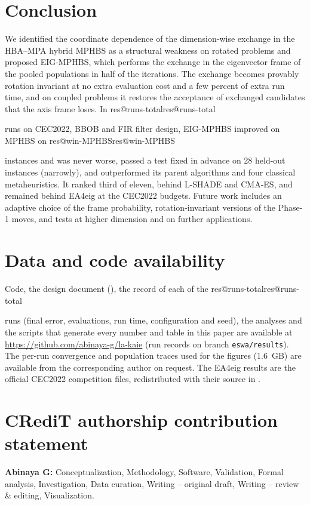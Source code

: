 \documentclass[preprint,12pt,authoryear]{elsarticle}
\makeatletter
\theoremstyle{remark}
\def\res#1{\ifcsname res@#1\endcsname\csname res@#1\endcsname\else\PackageError{res}{Undefined result key #1}{}\fi}
\makeatother
\begin{document}
\section{Conclusion}
\label{sec:conclusion}
We identified the coordinate dependence of the dimension-wise exchange in the HBA--MPA hybrid MPHBS as a structural
weakness on rotated problems and proposed EIG-MPHBS, which performs the exchange in the eigenvector frame of the pooled
populations in half of the iterations. The exchange becomes provably rotation invariant at no extra evaluation cost and
a few percent of extra run time, and on coupled problems it restores the acceptance of exchanged candidates that the
axis frame loses. In \res{runs-total} runs on CEC2022, BBOB and FIR filter design, EIG-MPHBS improved on MPHBS on
\res{win-MPHBS} instances and was never worse, passed a test fixed in advance on 28 held-out instances (narrowly), and
outperformed its parent algorithms and four classical metaheuristics. It ranked third of eleven, behind L-SHADE and
CMA-ES, and remained behind EA4eig at the CEC2022 budgets. Future work includes an adaptive choice of the frame
probability, rotation-invariant versions of the Phase-1 moves, and tests at higher dimension and on further
applications.

\section*{Data and code availability}
Code, the design document (), the record of each of the \res{runs-total}
runs (final error, evaluations, run time, configuration and seed), the analyses and the scripts that generate every
number and table in this paper are available at
\url{https://github.com/abinaya-g/la-kaie} (run records on branch \texttt{eswa/results}).
The per-run convergence and population traces used for the figures (1.6~GB) are available from the corresponding
author on request. The EA4eig results are the official CEC2022 competition files, redistributed with their source in
.

\section*{CRediT authorship contribution statement}
\textbf{Abinaya G:} Conceptualization, Methodology, Software, Validation, Formal analysis, Investigation, Data curation,
Writing -- original draft, Writing -- review \& editing, Visualization.
\end{document}
